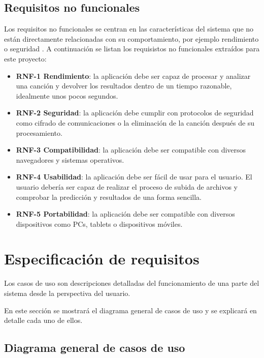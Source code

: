 \subsection{Requisitos no funcionales}

Los requisitos no funcionales se centran en las características del sistema que no están directamente relacionadas con su comportamiento, por ejemplo rendimiento o seguridad \cite{Blog_2018}.
A continuación se listan los requisistos no funcionales extraídos para este proyecto:

\begin{itemize}
\tightlist
\item \textbf{RNF-1 Rendimiento}: la aplicación debe ser capaz de procesar y analizar una canción y devolver los resultados dentro de un tiempo razonable, idealmente unos pocos segundos.

\item \textbf{RNF-2 Seguridad}: la aplicación debe cumplir con protocolos de seguridad como cifrado de comunicaciones o la eliminación de la canción después de su procesamiento.

\item \textbf{RNF-3 Compatibilidad}: la aplicación debe ser compatible con diversos navegadores y sistemas operativos.

\item \textbf{RNF-4 Usabilidad}: la aplicación debe ser fácil de usar para el usuario. El usuario debería ser capaz de realizar el proceso de subida de archivos y comprobar la predicción y resultados de una forma sencilla.

\item \textbf{RNF-5 Portabilidad}: la aplicación debe ser compatible con diversos dispositivos como PCs, tablets o dispositivos móviles.
\end{itemize}

\section{Especificación de requisitos}

Los casos de uso son descripciones detalladas del funcionamiento de una parte del sistema desde la perspectiva del usuario.

En este sección se mostrará el diagrama general de casos de uso y se explicará en detalle cada uno de ellos.

\subsection{Diagrama general de casos de uso}

